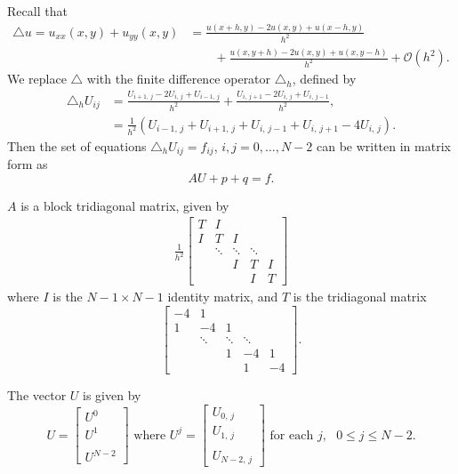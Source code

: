 Recall that 
 \begin{align*}
 \triangle u = u_{xx}(x,y) + u_{yy}(x,y) &= \frac{u(x+h,y) - 2u(x,y)+ u(x-h,y)}{h^2} \\
 & \qquad{}+ 
 \frac{u(x,y+h) - 2u(x,y)+ u(x,y-h)}{h^2} + \mathcal{O}(h^2).
 \end{align*}
 We replace $\triangle $ with the finite difference operator $\triangle_h$, defined by 
 \begin{align*}
 \triangle_h U_{ij} &= \frac{U_{i+1,\,j} - 2U_{i,\,j} + U_{i-1,\,j}}{h^2} + \frac{U_{i,\,j+1} - 2U_{i,\,j}+ U_{i,\,j-1}}{h^2},\\
&= \frac{1}{h^2}(U_{i-1,\,j} + U_{i+1,\,j} + U_{i,\,j-1} + U_{i,\,j+1}-4U_{i,\,j}).
 \end{align*}
 Then the set of equations  $\triangle_h U_{ij} = f_{ij}$, $i,j = 0,\ldots,N-2$ %
can be written in matrix form as
 \[AU + p +  q  = f.\]

$A$ is a block tridiagonal matrix, given by 
\begin{align}
	\frac{1}{h^2}
\begin{bmatrix}
T & I & &  &\\
I &T & I & &\\
&\ddots  & \ddots & \ddots & \\
&  & I & T & I \\
&  &  & I & T\end{bmatrix}\label{poisson2d:matrixA}
\end{align}
where $I$ is the $N-1\times N-1$ %
identity matrix, and $T$ is the tridiagonal matrix
\[\begin{bmatrix}
-4 & 1 & &  &\\
1 &-4 & 1 & &\\
&\ddots  & \ddots & \ddots & \\
&  & 1 & -4 & 1 \\
&  &  & 1 & -4 \end{bmatrix}.\]

The vector $U$ is given by 
\[U = \begin{bmatrix} U^0 \\ U^1 \\ \\ U^{N-2} \end{bmatrix} \text{ where } U^j = 
\begin{bmatrix} U_{0,\,j} \\ U_{1,\,j} \\ \\ U_{N-2,\,j} \end{bmatrix} \text{ for each } j, \text{ }0\leq j \leq N-2.\]

